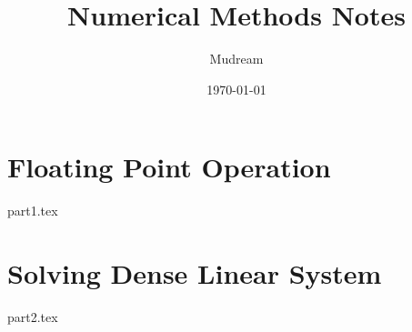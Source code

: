 \documentclass{article}
\title{Numerical Methods Notes}
\author{Mudream}
\date{\today}
\begin{document}
    \maketitle
    \part{Floating Point Operation}
    {part1.tex}
    \part{Solving Dense Linear System}
    {part2.tex}
\end{document}
